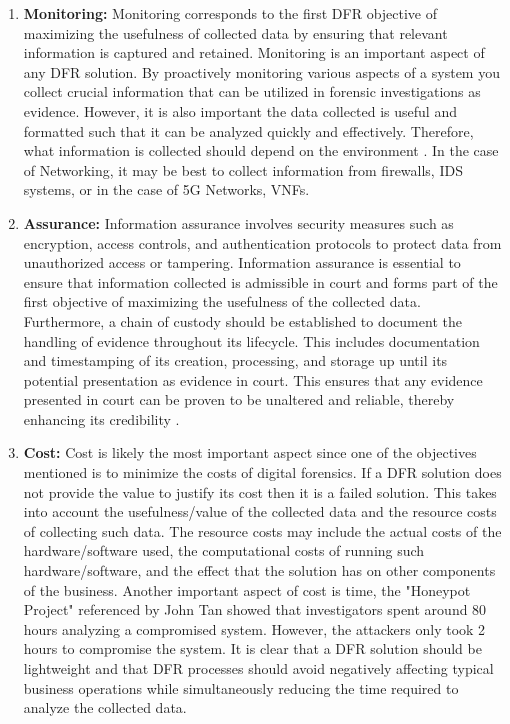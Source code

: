 \documentclass[final,1p,times,authoryear]{elsarticle}
\begin{document}
\begin{enumerate}[label=\thesubsection.\arabic*]
	\item \textbf{Monitoring:}
Monitoring corresponds to the first DFR objective of maximizing the usefulness of collected data by ensuring that relevant information is captured and retained. Monitoring is an important aspect of any DFR solution. By proactively monitoring various aspects of a system you collect crucial information that can be utilized in forensic investigations as evidence. However, it is also important the data collected is useful and formatted such that it can be analyzed quickly and effectively. Therefore, what information is collected should depend on the environment \citep{tan2001forensic}. In the case of Networking, it may be best to collect information from firewalls, IDS systems, or in the case of 5G Networks, VNFs.

	\item \textbf{Assurance:}
Information assurance involves security measures such as encryption, access controls, and authentication protocols to protect data from unauthorized access or tampering. Information assurance is essential to ensure that information collected is admissible in court \citep{9089494} and forms part of the first objective of maximizing the usefulness of the collected data. Furthermore, a chain of custody should be established to document the handling of evidence throughout its lifecycle. This includes documentation and timestamping of its creation, processing, and storage up until its potential presentation as evidence in court. This ensures that any evidence presented in court can be proven to be unaltered and reliable, thereby enhancing its credibility \citep{tan2001forensic}.

	\item \textbf{Cost:}
Cost is likely the most important aspect since one of the objectives mentioned is to minimize the costs of digital forensics. If a DFR solution does not provide the value to justify its cost then it is a failed solution. This takes into account the usefulness/value of the collected data and the resource costs of collecting such data. The resource costs may include the actual costs of the hardware/software used, the computational costs of running such hardware/software, and the effect that the solution has on other components of the business. Another important aspect of cost is time, the "Honeypot Project" referenced by John Tan \citep{tan2001forensic} showed that investigators spent around 80 hours analyzing a compromised system. However, the attackers only took 2 hours to compromise the system. It is clear that a DFR solution should be lightweight and that DFR processes should avoid negatively affecting typical business operations while simultaneously reducing the time required to analyze the collected data.


\end{enumerate}
\end{document}
